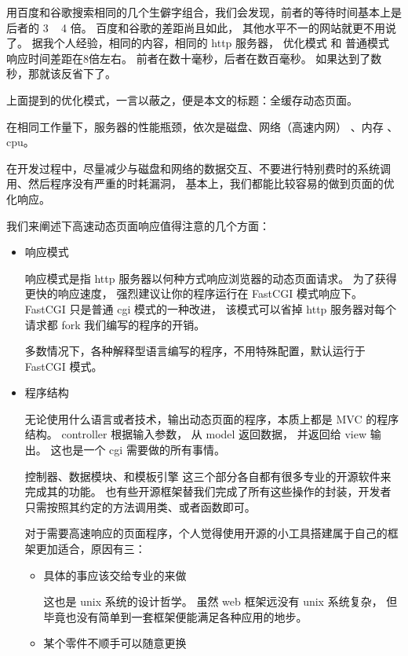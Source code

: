 \documentclass{article}
\begin{document}
\begin{itemize}
    用百度和谷歌搜索相同的几个生僻字组合，我们会发现，前者的等待时间基本上是后者的 3 ~ 4 倍。 百度和谷歌的差距尚且如此，
    其他水平不一的网站就更不用说了。 据我个人经验，相同的内容，相同的 http 服务器，
    优化模式 和 普通模式 响应时间差距在8倍左右。
    前者在数十毫秒，后者在数百毫秒。 如果达到了数秒，那就该反省下了。

    上面提到的优化模式，一言以蔽之，便是本文的标题：全缓存动态页面。

    在相同工作量下，服务器的性能瓶颈，依次是磁盘、网络（高速内网） 、内存 、cpu。

    在开发过程中，尽量减少与磁盘和网络的数据交互、不要进行特别费时的系统调用、然后程序没有严重的时耗漏洞，
    基本上，我们都能比较容易的做到页面的优化响应。

    我们来阐述下高速动态页面响应值得注意的几个方面：

    \begin{itemize}
    \item 响应模式

      响应模式是指 http 服务器以何种方式响应浏览器的动态页面请求。 为了获得更快的响应速度，
      强烈建议让你的程序运行在 FastCGI 模式响应下。 FastCGI 只是普通 cgi 模式的一种改进，
      该模式可以省掉 http 服务器对每个请求都 fork 我们编写的程序的开销。

      多数情况下，各种解释型语言编写的程序，不用特殊配置，默认运行于 FastCGI 模式。
      
    \item 程序结构

      无论使用什么语言或者技术，输出动态页面的程序，本质上都是 MVC 的程序结构。 controller 根据输入参数，
      从 model 返回数据， 并返回给 view 输出。  这也是一个 cgi 需要做的所有事情。

      控制器、数据模块、和模板引擎 这三个部分各自都有很多专业的开源软件来完成其的功能。 
      也有些开源框架替我们完成了所有这些操作的封装，开发者只需按照其约定的方法调用类、或者函数即可。

      对于需要高速响应的页面程序，个人觉得使用开源的小工具搭建属于自己的框架更加适合，原因有三：
      
      \begin{itemize}
      \item 具体的事应该交给专业的来做

        这也是 unix 系统的设计哲学。 虽然 web 框架远没有 unix 系统复杂，
        但毕竟也没有简单到一套框架便能满足各种应用的地步。

      \item 某个零件不顺手可以随意更换


\end{itemize}
\end{itemize}
\end{itemize}
\end{document}
